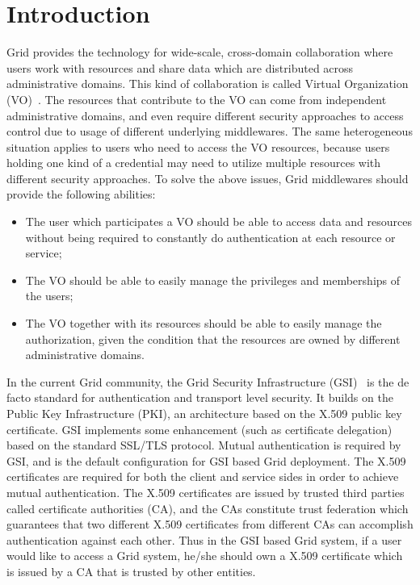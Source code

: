 \documentclass[twocolumn]{svjour3}         %
\begin{document}
\section{Introduction} 
\label{sec:intro}
Grid provides the technology for wide-scale, cross-domain collaboration where users work with resources and share data which are distributed across administrative domains. This kind of collaboration is called Virtual Organization (VO)~\cite{IFoster01}. The resources that contribute to the VO can come from independent administrative domains, and even require different security approaches to access control due to usage of different underlying middlewares. The same heterogeneous situation applies to users who need to access the VO resources, because users holding one kind of a credential may need to utilize multiple resources with different security approaches. To solve the above issues, Grid middlewares should provide the following abilities:
\begin{itemize}
\item The user which participates a VO should be able to access data and resources without being required to constantly do authentication at each resource or service;
\item The VO should be able to easily manage the privileges and memberships of the users;
\item The VO together with its resources should be able to easily manage the authorization, given the condition that the resources are owned by different administrative domains.
\end{itemize}
In the current Grid community, the Grid Security Infrastructure (GSI)~\cite{IFoster98} is the de facto standard for authentication and transport level security. It builds on the Public Key Infrastructure (PKI), an architecture based on the X.509 public key certificate. GSI implements some enhancement (such as certificate delegation) based on the standard SSL/TLS protocol. Mutual authentication is required by GSI, and is the default configuration for GSI based Grid deployment. The X.509 certificates are required for both the client and service sides in order to achieve mutual authentication. The X.509 certificates are issued by trusted third parties called certificate authorities (CA), and the CAs constitute trust federation which guarantees that two different X.509 certificates from different CAs can accomplish authentication against each other. Thus in the GSI based Grid system, if a user would like to access a Grid system, he/she should own a X.509 certificate which is issued by a CA that is trusted by other entities.
\end{document}
